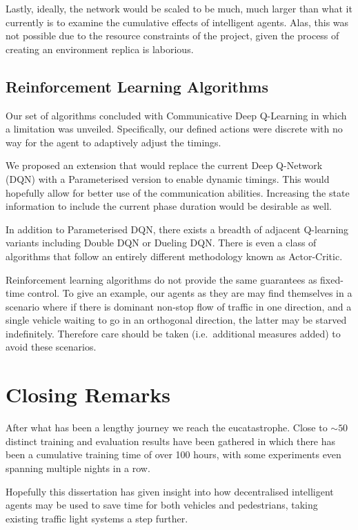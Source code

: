 \documentclass[a4paper]{report}
\begin{document}
Lastly, ideally, the network would be scaled to be much, much larger than what it currently is to examine the cumulative effects of intelligent agents. Alas, this was not possible due to the resource constraints of the project, given the process of creating an environment replica is laborious. 

\subsection{Reinforcement Learning Algorithms} 

Our set of algorithms concluded with Communicative Deep Q-Learning in which a limitation was unveiled. Specifically, our defined actions were discrete with no way for the agent to adaptively adjust the timings.

We proposed an extension that would replace the current Deep Q-Network (DQN) with a Parameterised version to enable dynamic timings. This would hopefully allow for better use of the communication abilities. Increasing the state information to include the current phase duration would be desirable as well. 

In addition to Parameterised DQN, there exists a breadth of adjacent Q-learning variants including Double DQN or Dueling DQN. There is even a class of algorithms that follow an entirely different methodology known as Actor-Critic.

Reinforcement learning algorithms do not provide the same guarantees as fixed-time control. To give an example, our agents as they are may find themselves in a scenario where if there is dominant non-stop flow of traffic in one direction, and a single vehicle waiting to go in an orthogonal direction, the latter may be starved indefinitely. Therefore care should be taken (i.e.\ additional measures added) to avoid these scenarios.

\section{Closing Remarks}

After what has been a lengthy journey we reach the eucatastrophe. Close to $\sim50$ distinct training and evaluation results have been gathered\footnotemark{} in which there has been a cumulative training time of over 100 hours, with some experiments even spanning multiple nights in a row.

Hopefully this dissertation has given insight into how decentralised intelligent agents may be used to save time for both vehicles and pedestrians, taking existing traffic light systems a step further.
\end{document}
